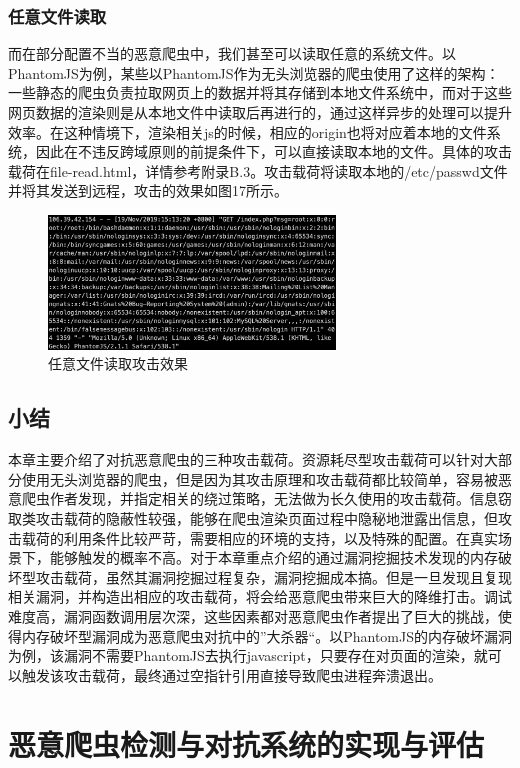 \documentclass[doctor,privacy,twoside]{buaa_mac}
\begin{document}
\subsection{任意文件读取}
而在部分配置不当的恶意爬虫中，我们甚至可以读取任意的系统文件。以PhantomJS为例，某些以PhantomJS作为无头浏览器的爬虫使用了这样的架构：一些静态的爬虫负责拉取网页上的数据并将其存储到本地文件系统中，而对于这些网页数据的渲染则是从本地文件中读取后再进行的，通过这样异步的处理可以提升效率。在这种情境下，渲染相关js的时候，相应的origin也将对应着本地的文件系统，因此在不违反跨域原则的前提条件下，可以直接读取本地的文件。具体的攻击载荷在file-read.html，详情参考附录B.3。攻击载荷将读取本地的/etc/passwd文件并将其发送到远程，攻击的效果如图17所示。

\centerline{}
\begin{figure}[!h]
  \centering
  \includegraphics[width=0.68\textwidth]{images/file_read.png}
  \caption{任意文件读取攻击效果}
  \label{fig:logo}
\end{figure}
\centerline{}

\section{小结}
本章主要介绍了对抗恶意爬虫的三种攻击载荷。资源耗尽型攻击载荷可以针对大部分使用无头浏览器的爬虫，但是因为其攻击原理和攻击载荷都比较简单，容易被恶意爬虫作者发现，并指定相关的绕过策略，无法做为长久使用的攻击载荷。信息窃取类攻击载荷的隐蔽性较强，能够在爬虫渲染页面过程中隐秘地泄露出信息，但攻击载荷的利用条件比较严苛，需要相应的环境的支持，以及特殊的配置。在真实场景下，能够触发的概率不高。对于本章重点介绍的通过漏洞挖掘技术发现的内存破坏型攻击载荷，虽然其漏洞挖掘过程复杂，漏洞挖掘成本搞。但是一旦发现且复现相关漏洞，并构造出相应的攻击载荷，将会给恶意爬虫带来巨大的降维打击。调试难度高，漏洞函数调用层次深，这些因素都对恶意爬虫作者提出了巨大的挑战，使得内存破坏型漏洞成为恶意爬虫对抗中的”大杀器“。以PhantomJS的内存破坏漏洞为例，该漏洞不需要PhantomJS去执行javascript，只要存在对页面的渲染，就可以触发该攻击载荷，最终通过空指针引用直接导致爬虫进程奔溃退出。


\chapter{恶意爬虫检测与对抗系统的实现与评估}
\end{document}
